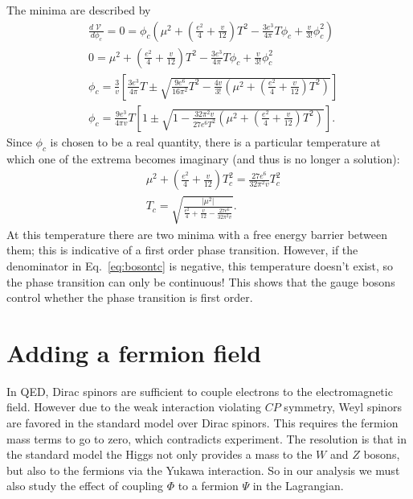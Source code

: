\documentclass[%
 reprint,
nofootinbib,
 amsmath,amssymb,
 aps,
floatfix,
]{revtex4-1}
\DeclareMathOperator{\V}{\mathcal{V}}
\begin{document}
The minima are described by
\begin{equation}
\begin{split}
    &\frac{d\V}{d\phi_c} = 0 = \phi_c \left(\mu^2 + \left(\frac{e^2}{4}+\frac{v}{12}\right)T^2 -\frac{3e^3}{4\pi}T\phi_c + \frac{v}{3!}\phi_c^2\right) \\
    &0 = \mu^2 + \left(\frac{e^2}{4}+\frac{v}{12}\right)T^2 -\frac{3e^3}{4\pi}T\phi_c + \frac{v}{3!}\phi_c^2 \\
    &\phi_c = \frac{3}{v}\left[\frac{3e^3}{4\pi}T \pm \sqrt{\frac{9e^6}{16\pi^2}T^2-\frac{4v}{3!}\left(\mu^2+\left(\frac{e^2}{4}+\frac{v}{12}\right)T^2\right)}\right] \\
    &\phi_c = \frac{9e^3}{4\pi v}T \left[1 \pm \sqrt{1 - \frac{32\pi^2 v}{27e^6 T^2}\left(\mu^2 + \left(\frac{e^2}{4}+\frac{v}{12}\right)T^2\right)}\right].
\end{split}
\end{equation}
Since $\phi_c$ is chosen to be a real quantity, there is a particular temperature at which one of the extrema becomes imaginary (and thus is no longer a solution):
\begin{align}
    &\mu^2 + \left(\frac{e^2}{4}+\frac{v}{12}\right)T_c^2 = \frac{27e^6}{32\pi^2 v}T_c^2 \\
    &T_c = \sqrt{\frac{|\mu^2|}{\frac{e^2}{4} + \frac{v}{12} - \frac{27e^6}{32\pi^2 v}}} \label{eq:bosontc}.
\end{align}
At this temperature there are two minima with a free energy barrier between them; this is indicative of a first order phase transition.
However, if the denominator in Eq.~\ref{eq:bosontc} is negative, this temperature doesn't exist, so the phase transition can only be continuous!
This shows that the gauge bosons control whether the phase transition is first order.

\section{\label{sec:fermions}Adding a fermion field}
In QED, Dirac spinors are sufficient to couple electrons to the electromagnetic field.
However due to the weak interaction violating $CP$ symmetry, Weyl spinors are favored in the standard model over Dirac spinors.
This requires the fermion mass terms to go to zero, which contradicts experiment.
The resolution is that in the standard model the Higgs not only provides a mass to the $W$ and $Z$ bosons, but also to the fermions via the Yukawa interaction.
So in our analysis we must also study the effect of coupling $\Phi$ to a fermion $\Psi$ in the Lagrangian. \\
\end{document}
